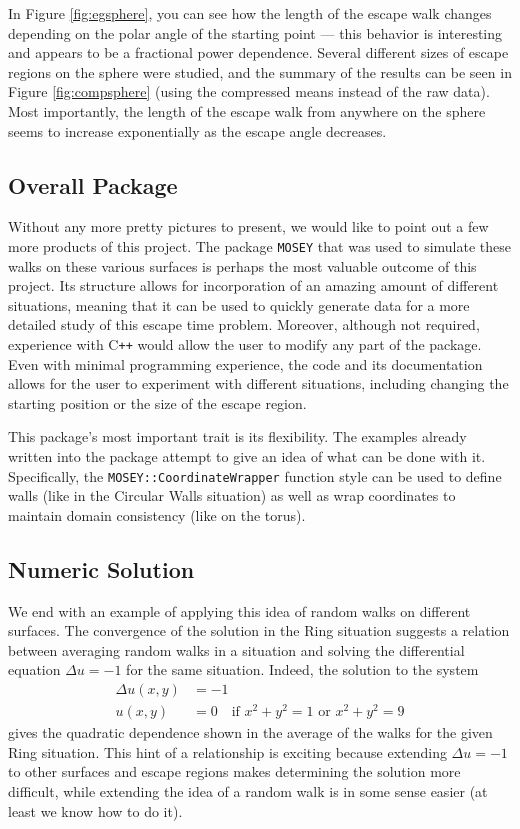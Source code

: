 \documentclass[12pt]{article}
\begin{document}
		In Figure \ref{fig:egsphere}, you can see how the length of the escape walk changes depending on the polar angle of the starting point --- this behavior is interesting and appears to be a fractional power dependence.
		Several different sizes of escape regions on the sphere were studied, and the summary of the results can be seen in Figure \ref{fig:compsphere} (using the compressed means instead of the raw data).
		Most importantly, the length of the escape walk from anywhere on the sphere seems to increase exponentially as the escape angle decreases.
		
	\subsection{Overall Package}
		Without any more pretty pictures to present, we would like to point out a few more products of this project.
		The package \texttt{MOSEY} that was used to simulate these walks on these various surfaces is perhaps the most valuable outcome of this project.
		Its structure allows for incorporation of an amazing amount of different situations, meaning that it can be used to quickly generate data for a more detailed study of this escape time problem.
		Moreover, although not required, experience with C\texttt{++} would allow the user to modify any part of the package.
		Even with minimal programming experience, the code and its documentation allows for the user to experiment with different situations, including changing the starting position or the size of the escape region.
		
		This package's most important trait is its flexibility.
		The examples already written into the package attempt to give an idea of what can be done with it.
		Specifically, the \texttt{MOSEY::CoordinateWrapper} function style can be used to define walls (like in the Circular Walls situation) as well as wrap coordinates to maintain domain consistency (like on the torus).
		
	\subsection{Numeric Solution} \label{NumericSoln}
		We end with an example of applying this idea of random walks on different surfaces.
		The convergence of the solution in the Ring situation suggests a relation between averaging random walks in a situation and solving the differential equation $\Delta u = -1$ for the same situation.
		Indeed, the solution to the system
		\begin{equation*} \begin{split} 
			\Delta u(x,y) & = -1 \\
			u(x,y) & = 0 \quad\text{if } x^2+y^2 = 1 \text{ or } x^2+y^2 = 9
		\end{split} \end{equation*}
		gives the quadratic dependence shown in the average of the walks for the given Ring situation.
		This hint of a relationship is exciting because extending $\Delta u = -1$ to other surfaces and escape regions makes determining the solution more difficult, while extending the idea of a random walk is in some sense easier (at least we know how to do it).
	


\end{document}
